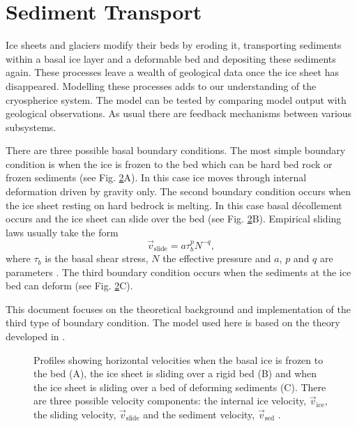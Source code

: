 \section{Sediment Transport}
Ice sheets and glaciers modify their beds by eroding it, transporting sediments within a basal ice layer and a deformable bed and depositing these sediments again. These processes leave a wealth of geological data once the ice sheet has disappeared. Modelling these processes adds to our understanding of the cryospherice system. The model can be tested by comparing model output with geological observations. As usual there are feedback mechanisms between various subsystems.

There are three possible basal boundary conditions. The most simple boundary condition is when the ice is frozen to the bed which can be hard bed rock or frozen sediments (see Fig. \ref{erosion.fig.velos}A). In this case ice moves through internal deformation driven by gravity only.  The second boundary condition occurs when the ice sheet resting on hard bedrock is melting. In this case basal d\'ecollement occurs and the ice sheet can slide over the bed (see Fig. \ref{erosion.fig.velos}B). Empirical sliding laws usually take the form
\begin{equation}
  \vec{v}_{\text{slide}} = a\tau_b^pN^{-q},
\end{equation}
where $\tau_b$ is the basal shear stress, $N$ the effective pressure and $a$, $p$ and $q$ are parameters \citep{Paterson1994}. The third boundary condition occurs when the sediments at the ice bed can deform (see Fig. \ref{erosion.fig.velos}C).

\begin{figure}[htbp]
  \centering
  
  \label{fig.stress_etc}
\end{figure}

This document focuses on the theoretical background and implementation of the third type of boundary condition. The model used here is based on the theory developed in \citet{Boulton1996a}. 

\begin{figure}[htbp]
  \centering
   
  \caption{Profiles showing horizontal velocities when the basal ice is frozen to the bed (A), the ice sheet is sliding over a rigid bed (B) and when the ice sheet is sliding over a bed of deforming sediments (C). There are three possible velocity components: the internal ice velocity, $\vec{v}_{\text{ice}}$, the sliding velocity, $\vec{v}_{\text{slide}}$ and the sediment velocity, $\vec{v}_{\text{sed}}$ \citep[after][]{Boulton1996a}.}
  \label{erosion.fig.velos}
\end{figure}

